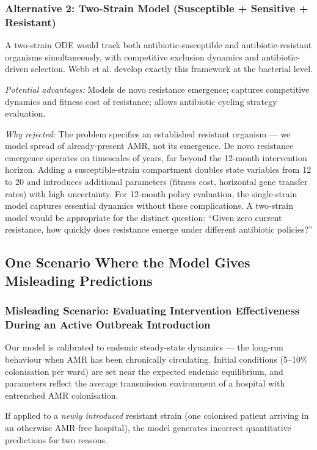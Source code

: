 \documentclass[12pt,a4paper]{article}
\begin{document}
\subsubsection{Alternative 2: Two-Strain Model (Susceptible + Sensitive + Resistant)}

A two-strain ODE would track both antibiotic-susceptible and antibiotic-resistant organisms simultaneously, with competitive exclusion dynamics and antibiotic-driven selection. Webb et al. \cite{webb2005} develop exactly this framework at the bacterial level.

\textit{Potential advantages:} Models de novo resistance emergence; captures competitive dynamics and fitness cost of resistance; allows antibiotic cycling strategy evaluation.

\textit{Why rejected:} The problem specifies an established resistant organism --- we model spread of already-present AMR, not its emergence. De novo resistance emergence operates on timescales of years, far beyond the 12-month intervention horizon. Adding a susceptible-strain compartment doubles state variables from 12 to 20 and introduces additional parameters (fitness cost, horizontal gene transfer rates) with high uncertainty. For 12-month policy evaluation, the single-strain model captures essential dynamics without these complications. A two-strain model would be appropriate for the distinct question: ``Given zero current resistance, how quickly does resistance emerge under different antibiotic policies?''

\subsection{One Scenario Where the Model Gives Misleading Predictions}

\subsubsection{Misleading Scenario: Evaluating Intervention Effectiveness During an Active Outbreak Introduction}

Our model is calibrated to endemic steady-state dynamics --- the long-run behaviour when AMR has been chronically circulating. Initial conditions (5--10\% colonisation per ward) are set near the expected endemic equilibrium, and parameters reflect the average transmission environment of a hospital with entrenched AMR colonisation.

If applied to a \textit{newly introduced} resistant strain (one colonised patient arriving in an otherwise AMR-free hospital), the model generates incorrect quantitative predictions for two reasons.
\end{document}
